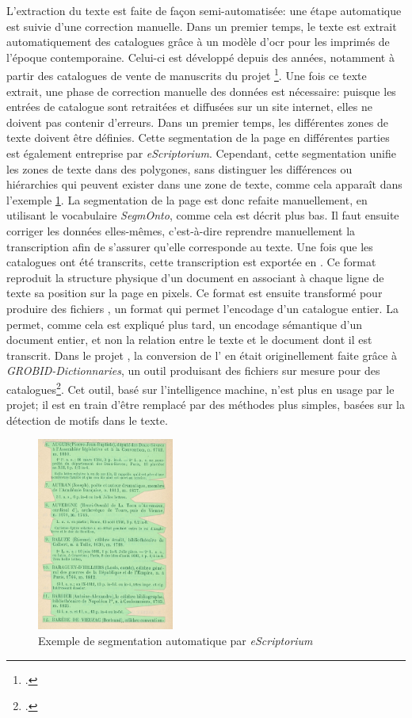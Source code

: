 L'extraction du texte est faite de façon semi-automatisée: une étape automatique est suivie d'une correction manuelle. Dans un premier temps, le texte est extrait automatiquement des catalogues grâce à un modèle d'\gls{ocr} pour les imprimés de l'époque contemporaine. Celui-ci est développé depuis des années, notamment à partir des catalogues de vente de manuscrits du projet \ktb{}\footcite[p. 34-35]{janes_du_2021}. Une fois ce texte extrait, une phase de correction manuelle des données est nécessaire: puisque les entrées de catalogue sont retraitées et diffusées sur un site internet, elles ne doivent pas contenir d'erreurs. Dans un premier temps, les différentes zones de texte doivent être définies. Cette segmentation de la page en différentes parties est également entreprise par \textit{eScriptorium}. Cependant, cette segmentation unifie les zones de texte dans des polygones, sans distinguer les différences ou hiérarchies qui peuvent exister dans une zone de texte, comme cela apparaît dans l'exemple \ref{fig:seg}. La segmentation de la page est donc refaite manuellement, en utilisant le vocabulaire \textit{SegmOnto}, comme cela est décrit plus bas. Il faut ensuite corriger les données elles-mêmes, c'est-à-dire reprendre manuellement la transcription afin de s'assurer qu'elle corresponde au texte. Une fois que les catalogues ont été transcrits, cette transcription est exportée en \alto{}. Ce format \xml{} reproduit la structure physique d'un document en associant à chaque ligne de texte sa position sur la page en pixels. Ce format est ensuite transformé pour produire des fichiers \xmltei{}, un format qui permet l'encodage d'un catalogue entier. La \tei{} permet, comme cela est expliqué plus tard, un encodage sémantique d'un document entier, et non la relation entre le texte et le document dont il est transcrit. Dans le projet \mssktb{}, la conversion de l'\alto{} en \tei{} était originellement faite grâce à \textit{GROBID-Dictionnaries}, un outil produisant des fichiers \tei{} sur mesure pour des catalogues\footcite{khemakhem_automatically_2018}. Cet outil, basé sur l'intelligence machine, n'est plus en usage par le projet; il est en train d'être remplacé par des méthodes plus simples, basées sur la détection de motifs dans le texte.

\begin{figure}[h]
	\centering
	\includegraphics[width=0.4\textwidth]{img/cat_000445_p2}
	\caption{Exemple de segmentation automatique par \textit{eScriptorium}}
	\label{fig:seg}
\end{figure}


